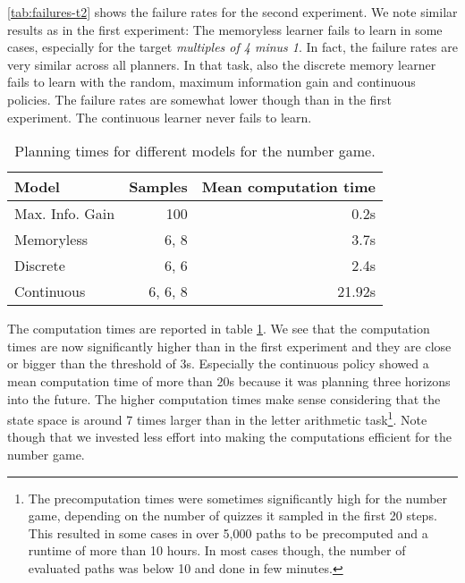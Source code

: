 \autoref{tab:failures-t2} shows the failure rates for the second experiment. 
We note similar results as in the first experiment: The memoryless learner fails to learn in some cases, especially for the target \textit{multiples of 4 minus 1}. In fact, the failure rates are very similar across all planners.
In that task, also the discrete memory learner fails to learn with the random, maximum information gain and continuous policies.
The failure rates are somewhat lower though than in the first experiment.
The continuous learner never fails to learn.


\begin{table}
\centering
\small
\begin{tabular}{lr|r}
\hline
\textbf{Model}  & \textbf{Samples}    & \textbf{Mean computation time}  \\
\hline
Max. Info. Gain & 100             & 0.2s                  \\
\hline
Memoryless      & 6, 8            & 3.7s                  \\
Discrete        & 6, 6            & 2.4s                  \\
Continuous      & 6, 6, 8            & 21.92s                  \\
\hline
\end{tabular}
\caption{Planning times for different models for the number game.}
\label{tab:times-t2}
\end{table}

The computation times are reported in table \ref{tab:times-t2}. We see that the computation times are now significantly higher than in the first experiment and they are close or bigger than the threshold of 3s. 
Especially the continuous policy showed a mean computation time of more than 20s because it was planning three horizons into the future.
The higher computation times make sense considering that the state space is around 7 times larger than in the letter arithmetic task\footnote{The precomputation times were sometimes significantly high for the number game, depending on the number of quizzes it sampled in the first 20 steps. This resulted in some cases in over 5,000 paths to be precomputed and a runtime of more than 10 hours. In most cases though, the number of evaluated paths was below 10 and done in few minutes.}.
Note though that we invested less effort into making the computations efficient for the number game.

